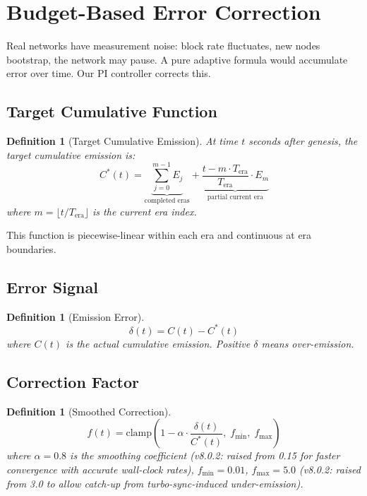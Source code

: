\documentclass[11pt,a4paper]{article}
\newtheorem{definition}[theorem]{Definition}
\begin{document}
\section{Budget-Based Error Correction}
\label{sec:correction}

Real networks have measurement noise: block rate fluctuates, new nodes bootstrap, the network may pause. A pure adaptive formula would accumulate error over time. Our PI controller corrects this.

\subsection{Target Cumulative Function}

\begin{definition}[Target Cumulative Emission]
At time $t$ seconds after genesis, the target cumulative emission is:
\begin{equation}
    C^*(t) = \underbrace{\sum_{j=0}^{m-1} E_j}_{\text{completed eras}} + \underbrace{\frac{t - m \cdot T_{\text{era}}}{T_{\text{era}}} \cdot E_m}_{\text{partial current era}}
\end{equation}
where $m = \lfloor t / T_{\text{era}} \rfloor$ is the current era index.
\end{definition}

This function is piecewise-linear within each era and continuous at era boundaries.

\subsection{Error Signal}

\begin{definition}[Emission Error]
\begin{equation}
    \delta(t) = C(t) - C^*(t)
\end{equation}
where $C(t)$ is the actual cumulative emission. Positive $\delta$ means over-emission.
\end{definition}

\subsection{Correction Factor}

\begin{definition}[Smoothed Correction]
\begin{equation}
    f(t) = \text{clamp}\left(1 - \alpha \cdot \frac{\delta(t)}{C^*(t)}, \; f_{\min}, \; f_{\max}\right)
\end{equation}
where $\alpha = 0.8$ is the smoothing coefficient (v8.0.2: raised from 0.15 for faster convergence with accurate wall-clock rates), $f_{\min} = 0.01$, $f_{\max} = 5.0$ (v8.0.2: raised from 3.0 to allow catch-up from turbo-sync-induced under-emission).
\end{definition}
\end{document}
